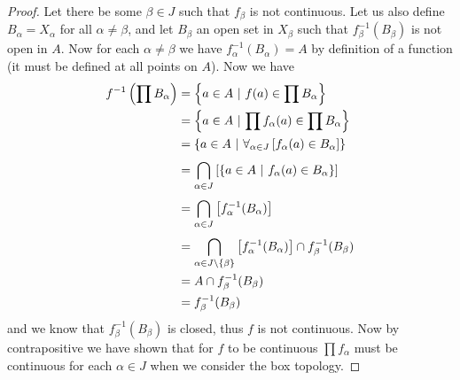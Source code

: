 \documentclass{article}
\begin{document}
\begin{proof}
	Let there be some $\beta \in J$ such that $f_\beta$ is not continuous. Let us also define $B_\alpha = X_\alpha$ for all $\alpha\not= \beta$, and let $B_\beta$ an open set in $X_\beta$ such that $f_\beta^{-1}(B_\beta)$ is not open in $A$. Now for each $\alpha \not= \beta$ we have $f_\alpha^{-1}(B_\alpha) = A$ by definition of a function (it must be defined at all points on $A$). Now we have
	\def\LB{\left[}
	\def\RB{\right]}
	\begin{align*}
		f^{-1}\left(\prod B_\alpha\right) &= \setbuilder{a\in A}{f(a) \in \prod B_\alpha} \\
		&= \setbuilder{a \in A}{\prod f_\alpha(a) \in \prod B_\alpha} \\
		&= \setbuilder{a \in A}{\All {\alpha \in J}{f_\alpha(a) \in B_\alpha}} \\
		&= \interacross{\alpha\in J}{\setbuilder{a\in A}{f_\alpha(a) \in B_\alpha}} \\
		&= \interacross{\alpha\in J}{f_\alpha^{-1}(B_\alpha)} \\
		&= \interacross{\alpha \in J\setminus \set\beta}{f_\alpha^{-1}(B_\alpha)} \inter f_\beta^{-1}(B_\beta) \\
		&= A \inter f_\beta^{-1}(B_\beta) \\
		&= f_\beta^{-1}(B_\beta)
	\end{align*}
	and we know that $f_\beta^{-1}(B_\beta)$ is closed, thus $f$ is not continuous. Now by contrapositive we have shown that for $f$ to be continuous $\prod f_\alpha$ must be continuous for each $\alpha \in J$ when we consider the box topology. 
\end{proof}
\end{document}
